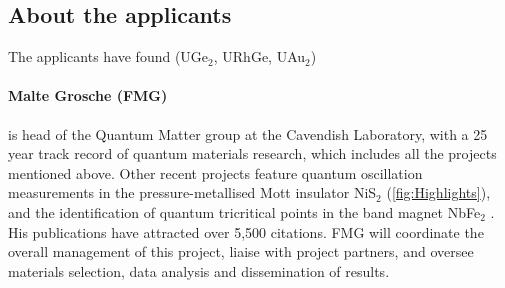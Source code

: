 
\subsection*{About the applicants}
\noindent 
The applicants have found (UGe$_2$, URhGe, UAu$_2$)
\paragraph{Malte Grosche (FMG)} 
is head of the Quantum Matter
group at the Cavendish Laboratory, with a 25 year track record of quantum materials research, which includes all the projects mentioned above. 
Other recent projects feature %
quantum oscillation measurements in the pressure-metallised Mott insulator NiS$_2$ %
 (\autoref{fig:Highlights}), and the identification of quantum tricritical points in the band magnet NbFe$_2$ . %
His publications 
have attracted over 5,500
citations. 
FMG will coordinate the overall management of this project, liaise with project partners, and oversee materials selection, data analysis and dissemination of results. 


